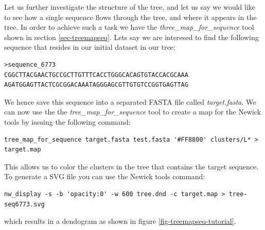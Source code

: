 Let us further investigate the structure of the tree, and let us say
we would like to see how a single sequence flows through the tree,
and where it appears in the tree. In order to achieve such a task we
have the \emph{three\_map\_for\_sequence} tool shown in section
\ref{sec-treemapseq}. Lets say we are interesed to find the following
sequence that resides in our initial dataset in our tree:
\begin{lstlisting}
>sequence_6773
CGGCTTACGAACTGCCGCTTGTTTCACCTGGGCACAGTGTACCACGCAAA
AGATGGAGTTACTCGCGGACAAATAGGGAGCGTTGTGTCCGGTGAGTTAG
\end{lstlisting}
We hence save this sequence into a separated FASTA file called
\emph{target.fasta}.
We can now use the the \emph{tree\_map\_for\_sequence} tool to create
a map for the Newick tools by issuing the following command:
\begin{lstlisting}
tree_map_for_sequence target.fasta test.fasta '#FF8800' clusters/L* > target.map
\end{lstlisting}
This allows us to color the clusters in the tree that contains the
target sequence. To generate a SVG file you can use the Newick tools
command:
\begin{lstlisting}
nw_display -s -b 'opacity:0' -w 600 tree.dnd -c target.map > tree-seq6773.svg
\end{lstlisting}
which results in a dendogram as shown in figure \ref{fig-treemapseq-tutorial}.
